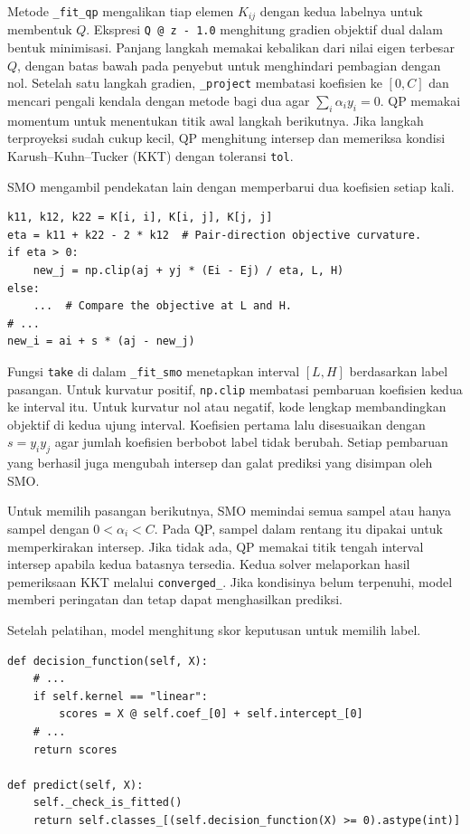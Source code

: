 Metode \texttt{\_fit\_qp} mengalikan tiap elemen $K_{ij}$ dengan kedua
labelnya untuk membentuk $Q$. Ekspresi \texttt{Q @ z - 1.0} menghitung
gradien objektif dual dalam bentuk minimisasi. Panjang langkah memakai
kebalikan dari nilai eigen terbesar $Q$, dengan batas bawah pada penyebut
untuk menghindari pembagian dengan nol. Setelah satu langkah
gradien, \texttt{\_project} membatasi koefisien ke $[0,C]$ dan mencari
pengali kendala dengan metode bagi dua agar $\sum_i\alpha_i y_i=0$.
QP memakai momentum untuk menentukan titik awal langkah berikutnya.
Jika langkah terproyeksi sudah cukup kecil, QP menghitung intersep dan
memeriksa kondisi Karush--Kuhn--Tucker (KKT) dengan toleransi \texttt{tol}.

SMO mengambil pendekatan lain dengan memperbarui dua koefisien setiap kali.

\begin{lstlisting}[caption={Pembaruan koefisien pada SMO}, label={lst:svm-smo}]
k11, k12, k22 = K[i, i], K[i, j], K[j, j]
eta = k11 + k22 - 2 * k12  # Pair-direction objective curvature.
if eta > 0:
    new_j = np.clip(aj + yj * (Ei - Ej) / eta, L, H)
else:
    ...  # Compare the objective at L and H.
# ...
new_i = ai + s * (aj - new_j)
\end{lstlisting}

Fungsi \texttt{take} di dalam \texttt{\_fit\_smo} menetapkan interval
$[L,H]$ berdasarkan label pasangan. Untuk kurvatur positif, \texttt{np.clip}
membatasi pembaruan koefisien kedua ke interval itu. Untuk kurvatur nol
atau negatif, kode lengkap membandingkan objektif di kedua ujung interval.
Koefisien pertama lalu disesuaikan dengan $s=y_i y_j$ agar jumlah koefisien
berbobot label tidak berubah. Setiap pembaruan yang berhasil juga mengubah
intersep dan galat prediksi yang disimpan oleh SMO.

Untuk memilih pasangan berikutnya, SMO memindai semua sampel atau hanya
sampel dengan $0<\alpha_i<C$. Pada QP, sampel dalam rentang itu dipakai
untuk memperkirakan intersep. Jika tidak ada, QP memakai titik tengah
interval intersep apabila kedua batasnya tersedia. Kedua solver
melaporkan hasil pemeriksaan KKT melalui \texttt{converged\_}. Jika
kondisinya belum terpenuhi, model memberi peringatan dan tetap dapat
menghasilkan prediksi.

Setelah pelatihan, model menghitung skor keputusan untuk memilih label.

\begin{lstlisting}[caption={Skor linear dan pemetaan skor ke label}, label={lst:svm-predict}]
def decision_function(self, X):
    # ...
    if self.kernel == "linear":
        scores = X @ self.coef_[0] + self.intercept_[0]
    # ...
    return scores

def predict(self, X):
    self._check_is_fitted()
    return self.classes_[(self.decision_function(X) >= 0).astype(int)]
\end{lstlisting}

